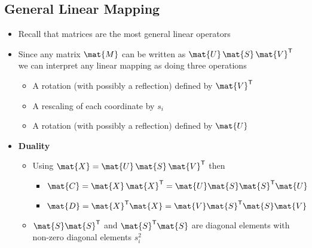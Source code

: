 \documentclass[11pt]{article}
\newcommand{\tr}{\textsf{T}}
\begin{document}
\subsection{General Linear Mapping}
\label{sec:org6ff3378}
\begin{itemize}
\item Recall that matrices are the most general linear operators
\item Since any matrix \(\mat{M}\) can be written as
\(\mat{U}\,\mat{S}\,\mat{V}^\tr\) we can interpret any linear
mapping as doing three operations
\begin{itemize}
\item A rotation (with possibly a reflection) defined by \(\mat{V}^\tr\)
\item A rescaling of each coordinate by \(s_i\)
\item A rotation (with possibly a reflection) defined by \(\mat{U}\)
\end{itemize}
\item \textbf{Duality}
\begin{itemize}
\item Using \(\mat{X} = \mat{U}\,\mat{S}\,\mat{V}^\tr\) then
\begin{itemize}
\item \(\mat{C} = \mat{X}\,\mat{X}^\tr = \mat{U}\mat{S}\mat{S}^\tr\mat{U}\)
\item \(\mat{D} = \mat{X}^\tr\mat{X} = \mat{V}\mat{S}^\tr\mat{S}\mat{V}\)
\end{itemize}
\item \(\mat{S}\mat{S}^\tr\) and \(\mat{S}^\tr\mat{S}\) are diagonal
elements with non-zero diagonal elements \(s_i^2\)
\end{itemize}
\end{itemize}
\end{document}
